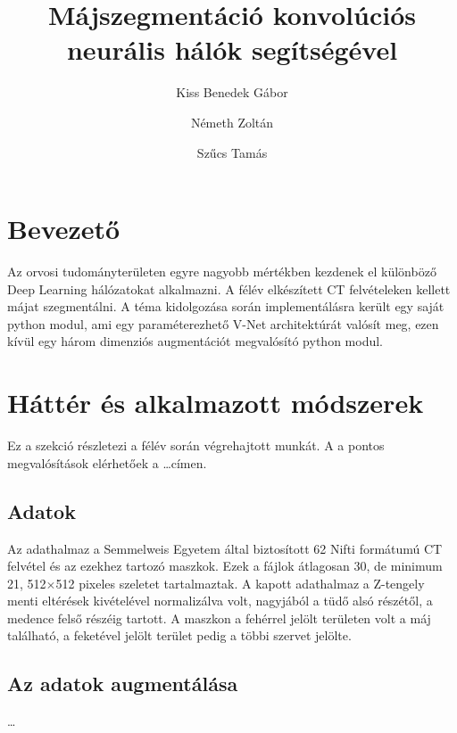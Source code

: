 \documentclass[a4paper]{article}
\title{Májszegmentáció konvolúciós neurális hálók segítségével}
\author{Kiss Benedek Gábor\and Németh Zoltán\and Szűcs Tamás }
\begin{document}
	\maketitle
	\section*{Bevezető}
	Az orvosi tudományterületen egyre nagyobb mértékben kezdenek el különböző Deep Learning hálózatokat alkalmazni.\cite{2019arXiv190903029S} A félév elkészített CT felvételeken kellett májat szegmentálni.	A téma kidolgozása során implementálásra került egy saját python modul, ami egy paraméterezhető V-Net architektúrát valósít meg, ezen kívül egy három dimenziós augmentációt megvalósító python modul.
	
	
	\section*{Háttér és alkalmazott módszerek}
	Ez a szekció részletezi a félév során végrehajtott munkát. A  a pontos megvalósítások elérhetőek a \dots címen.
	
	\subsection*{Adatok}
	Az adathalmaz a Semmelweis Egyetem által biztosított 62 Nifti formátumú CT felvétel és az ezekhez tartozó maszkok. Ezek a fájlok átlagosan 30, de minimum 21, 512$\times$512 pixeles szeletet tartalmaztak. A kapott adathalmaz a Z-tengely menti eltérések kivételével normalizálva volt, nagyjából a tüdő alsó részétől, a medence felső részéig tartott. A maszkon a fehérrel jelölt területen volt a máj található, a feketével jelölt terület pedig a többi szervet jelölte.
	\subsection*{Az adatok augmentálása}
	\dots
\end{document}
